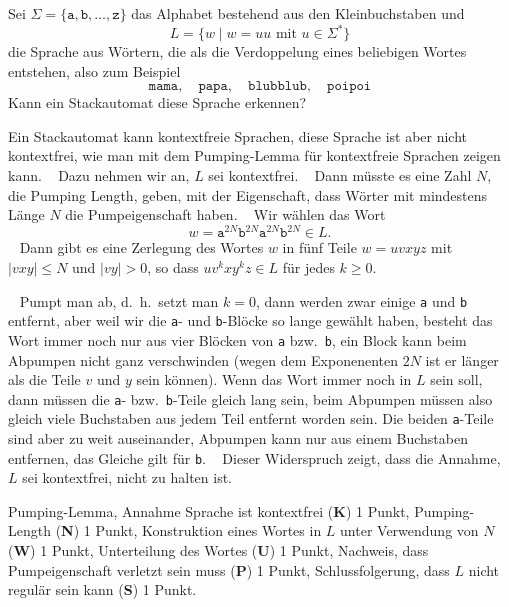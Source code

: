 Sei $\Sigma=\{\texttt{a},\texttt{b},\dots,\texttt{z}\}$ das Alphabet
bestehend aus den Kleinbuchstaben und 
\[
L=\{ w\mid \text{$w=uu$ mit $u\in\Sigma^*$}\}
\]
die Sprache aus Wörtern, die als die Verdoppelung eines beliebigen
Wortes entstehen, also zum Beispiel
\[
\texttt{mama},\quad
\texttt{papa},\quad
\texttt{blubblub},\quad
\texttt{poipoi}
\]
Kann ein Stackautomat diese Sprache erkennen?


\begin{loesung}
Ein Stackautomat kann kontextfreie Sprachen, diese Sprache ist aber nicht
kontextfrei, wie man mit dem Pumping-Lemma für kontextfreie
Sprachen zeigen kann.
~%
Dazu nehmen wir an, $L$ sei kontextfrei.
~%
Dann müsste es eine Zahl $N$, die Pumping Length, geben, mit der Eigenschaft,
dass Wörter mit mindestens Länge $N$ die Pumpeigenschaft haben.
~%
Wir wählen das Wort
\[
w=
\texttt{a}^{2N}
\texttt{b}^{2N}
\texttt{a}^{2N}
\texttt{b}^{2N}
\in L.
\]
~%
Dann gibt es eine Zerlegung des Wortes $w$ in fünf Teile $w=uvxyz$ mit
$|vxy|\le N$ und $|vy|>0$, so dass $uv^kxy^kz\in L$ für jedes $k\ge 0$.

~%
Pumpt man ab, d.~h.~setzt man $k=0$, dann werden zwar einige \texttt{a}
und \texttt{b} entfernt, aber weil wir die \texttt{a}- und \texttt{b}-Blöcke
so lange gewählt haben, besteht das Wort immer noch nur aus
vier Blöcken von \texttt{a} bzw.~\texttt{b}, ein Block kann beim
Abpumpen nicht ganz verschwinden (wegen dem Exponenenten $2N$ ist er
länger als die Teile $v$ und $y$ sein können).
Wenn das Wort immer noch in $L$ sein soll, dann müssen die \texttt{a}-
bzw.~\texttt{b}-Teile gleich lang sein, beim Abpumpen müssen also
gleich viele Buchstaben aus jedem Teil entfernt worden sein.
Die beiden \texttt{a}-Teile sind aber zu weit auseinander, Abpumpen
kann nur aus einem Buchstaben entfernen, das Gleiche gilt für \texttt{b}.
~%
Dieser Widerspruch zeigt, dass die Annahme, $L$ sei kontextfrei, nicht
zu halten ist.
\end{loesung}

\begin{bewertung}
Pumping-Lemma, Annahme Sprache ist kontextfrei ({\bf K}) 1 Punkt,
Pumping-Length ({\bf N}) 1 Punkt,
Konstruktion eines Wortes in $L$ unter Verwendung von $N$ ({\bf W}) 1 Punkt,
Unterteilung des Wortes ({\bf U}) 1 Punkt,
Nachweis, dass Pumpeigenschaft verletzt sein muss ({\bf P}) 1 Punkt,
Schlussfolgerung, dass $L$ nicht regulär sein kann ({\bf S}) 1 Punkt.
\end{bewertung}




